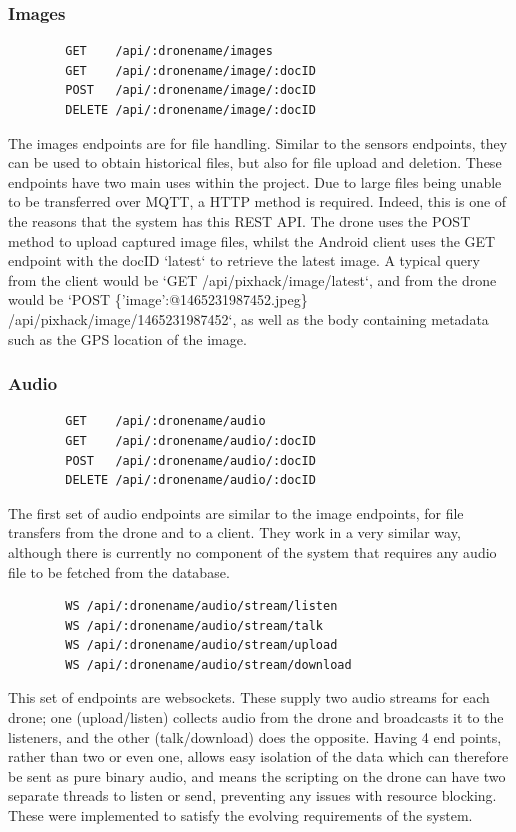 \documentclass{article}
\begin{document}
\subsubsection{Images}
\begin{center}
	\begin{lstlisting}
		GET    /api/:dronename/images
		GET    /api/:dronename/image/:docID
		POST   /api/:dronename/image/:docID
		DELETE /api/:dronename/image/:docID
	\end{lstlisting}
\end{center}
The images endpoints are for file handling. Similar to the sensors endpoints, they can be used to obtain historical files, but also for file upload and deletion. These endpoints have two main uses within the project. Due to large files being unable to be transferred over MQTT, a HTTP method is required. Indeed, this is one of the reasons that the system has this REST API. The drone uses the POST method to upload captured image files, whilst the Android client uses the GET endpoint with the docID `latest` to retrieve the latest image. A typical query from the client would be `GET /api/pixhack/image/latest`, and from the drone would be `POST \{'image':@1465231987452.jpeg\} /api/pixhack/image/1465231987452`, as well as the body containing metadata such as the GPS location of the image. 

\subsubsection{Audio}
\begin{center}
	\begin{lstlisting}
		GET    /api/:dronename/audio
		GET    /api/:dronename/audio/:docID
		POST   /api/:dronename/audio/:docID
		DELETE /api/:dronename/audio/:docID
	\end{lstlisting}
\end{center}
The first set of audio endpoints are similar to the image endpoints, for file transfers from the drone and to a client. They work in a very similar way, although there is currently no component of the system that requires any audio file to be fetched from the database. 
\begin{center}	
	\begin{lstlisting}
		WS /api/:dronename/audio/stream/listen
		WS /api/:dronename/audio/stream/talk
		WS /api/:dronename/audio/stream/upload
		WS /api/:dronename/audio/stream/download
	\end{lstlisting}
\end{center}
This set of endpoints are websockets. These supply two audio streams for each drone; one (upload/listen) collects audio from the drone and broadcasts it to the listeners, and the other (talk/download) does the opposite. Having 4 end points, rather than two or even one, allows easy isolation of the data which can therefore be sent as pure binary audio, and means the scripting on the drone can have two separate threads to listen or send, preventing any issues with resource blocking. These were implemented to satisfy the evolving requirements of the system. 
\end{document}
